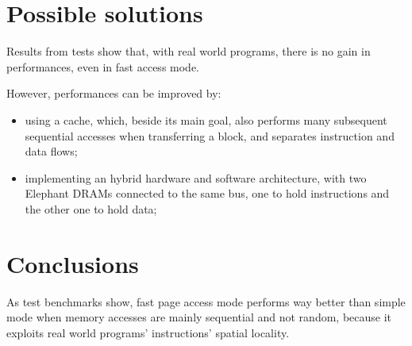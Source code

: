 \documentclass[a4paper,12pt]{article}
\newcommand{\memoryname}{Elephant}
\begin{document}






\section{Possible solutions}
Results from tests show that, with real world programs, there is no gain in performances, even in fast access mode.

However, performances can be improved by:

\begin{itemize}
  \item using a cache, which, beside its main goal, also performs many subsequent sequential accesses when transferring a block, and separates instruction and data flows;
  \item implementing an hybrid hardware and software architecture, with two \memoryname{} DRAMs connected to the same bus, one to hold instructions and the other one to hold data;
\end{itemize}

\section{Conclusions}
As test benchmarks show, fast page access mode performs way better than simple mode when memory accesses are mainly sequential and not random, because it exploits real world programs' instructions' spatial locality.
\end{document}
